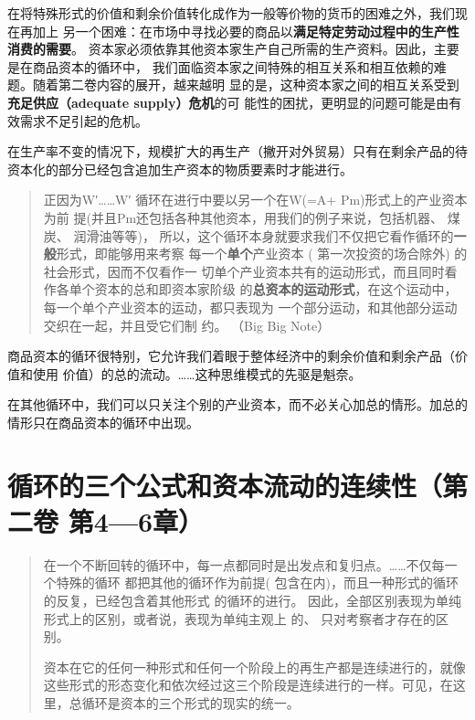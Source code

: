 在将特殊形式的价值和剩余价值转化成作为一般等价物的货币的困难之外，我们现在再加上
另一个困难：在市场中寻找必要的商品以\textbf{满足特定劳动过程中的生产性消费的需要}。
资本家必须依靠其他资本家生产自己所需的生产资料。因此，主要是在商品资本的循环中，
我们面临资本家之间特殊的相互关系和相互依赖的难题。随着第二卷内容的展开，越来越明
显的是，这种资本家之间的相互关系受到\textbf{充足供应（adequate supply）危机}的可
能性的困扰，更明显的问题可能是由有效需求不足引起的危机。

在生产率不变的情况下，规模扩大的再生产（撇开对外贸易）只有在剩余产品的待资本化的部分已经包含追加生产资本的物质要素时才能进行。 

\begin{quotation}
  正因为W′……W′ 循环在进行中要以另一个在W(=A+ Pm)形式上的产业资本为前
  提(并且Pm还包括各种其他资本，用我们的例子来说，包括机器、 煤炭、 润滑油等等)，
  所以，这个循环本身就要求我们不仅把它看作循环的\textbf{一般}形式，即能够用来考察
  每一个\textbf{单个}产业资本 ( 第一次投资的场合除外) 的社会形式，因而不仅看作一
  切单个产业资本共有的运动形式，而且同时看作各单个资本的总和即资本家阶级
  的\textbf{总资本的运动形式}，在这个运动中，每一个单个产业资本的运动，都只表现为
  一个部分运动，和其他部分运动交织在一起，并且受它们制
  约。 （Big Big Note）

\end{quotation}
商品资本的循环很特别，它允许我们着眼于整体经济中的剩余价值和剩余产品（价值和使用
价值）的总的流动。……这种思维模式的先驱是魁奈。

在其他循环中，我们可以只关注个别的产业资本，而不必关心加总的情形。加总的情形只在商品资本的循环中出现。

\chapter{循环的三个公式和资本流动的连续性（第二卷 第4—6章）}

\begin{quotation}
  在一个不断回转的循环中，每一点都同时是出发点和复归点。……不仅每一个特殊的循环
  都把其他的循环作为前提( 包含在内)，而且一种形式的循环的反复，已经包含着其他形式
  的循环的进行。 因此，全部区别表现为单纯形式上的区别，或者说，表现为单纯主观上
  的、 只对考察者才存在的区别。

资本在它的任何一种形式和任何一个阶段上的再生产都是连续进行的，就像这些形式的形态变化和依次经过这三个阶段是连续进行的一样。可见，在这里，总循环是资本的三个形式的现实的统一。 

\end{quotation}

